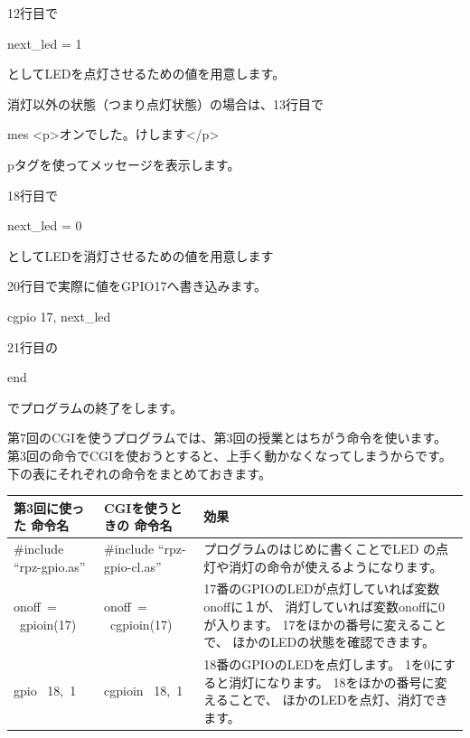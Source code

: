 \documentclass[a4paper,12pt,dvipdfmx]{jarticle}
\begin{document}
\bigskip

12行目で

next\_led = 1

としてLEDを点灯させるための値を用意します。

\bigskip

消灯以外の状態（つまり点灯状態）の場合は、13行目で

mes
	{\textquotedbl}{\textless}p{\textgreater}オンでした。けします{\textless}/p{\textgreater}{\textquotedbl}

pタグを使ってメッセージを表示します。

\bigskip

18行目で

next\_led = 0

としてLEDを消灯させるための値を用意します

\bigskip

20行目で実際に値をGPIO17へ書き込みます。

cgpio 17, next\_led




\bigskip

21行目の

end

でプログラムの終了をします。


\bigskip



第7回のCGIを使うプログラムでは、第3回の授業とはちがう命令を使います。\\
第3回の命令でCGIを使おうとすると、上手く動かなくなってしまうからです。\\
下の表にそれぞれの命令をまとめておきます。\\

\clearpage
\begin{flushleft}
	\tablefirsthead{}
	\tablehead{}
	\tabletail{}
	\tablelasttail{}
	\begin{supertabular}{|m{5.0cm}|m{5.5cm}|m{7.0cm}|}
		\hline
		第3回に使った
		命令名 &
		CGIを使うときの
		命令名&
		効果
		\\\hline

		\#include “rpz-gpio.as”&
		\#include “rpz-gpio-cl.as”&
		プログラムのはじめに書くことでLED
		の点灯や消灯の命令が使えるようになります。
		\\\hline

		onoff\ = \ gpioin(17)&

		onoff\ = \ cgpioin(17)&
		17番のGPIOのLEDが点灯していれば変数onoffに１が、
		消灯していれば変数onoffに0が入ります。
		17をほかの番号に変えることで、
		ほかのLEDの状態を確認できます。
		\\\hline

		gpio \ 18,\ 1&
		cgpioin \ 18,\ 1&
		18番のGPIOのLEDを点灯します。
		1を0にすると消灯になります。
		18をほかの番号に変えることで、
		ほかのLEDを点灯、消灯できます。
		\\\hline



	\end{supertabular}
\end{flushleft}
\end{document}
